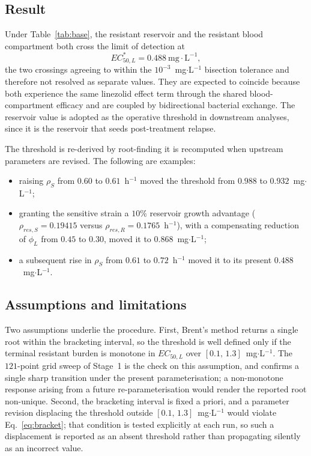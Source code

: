 \documentclass[11pt]{article}
\begin{document}
\subsection{Result}
\label{sec:threshold_result}

Under Table~\ref{tab:base}, the resistant reservoir and the resistant blood
compartment both cross the limit of detection at
\begin{equation}
EC_{50,L}^{*} = 0.488~\mathrm{mg}\cdot\mathrm{L}^{-1},
\end{equation}
the two crossings agreeing to within the $10^{-3}$~mg$\cdot$L$^{-1}$
bisection tolerance and therefore not resolved as separate values. They are
expected to coincide because both experience the same linezolid effect term
through the shared blood-compartment efficacy and are coupled by
bidirectional bacterial exchange. The reservoir value is adopted as the
operative threshold in downstream analyses, since it is the reservoir that
seeds post-treatment relapse.

The threshold is re-derived by root-finding it is recomputed when upstream parameters are revised.
The following are examples:

\begin{itemize}
\item raising $\rho_S$ from $0.60$ to $0.61$~h$^{-1}$ moved the threshold
from $0.988$ to $0.932$~mg$\cdot$L$^{-1}$;
\item granting the sensitive strain a $10\%$ reservoir growth advantage
($\rho_{res,S} = 0.19415$ versus $\rho_{res,R} = 0.1765$~h$^{-1}$), with a
compensating reduction of $\phi_L$ from $0.45$ to $0.30$, moved it to
$0.868$~mg$\cdot$L$^{-1}$;
\item a subsequent rise in $\rho_S$ from $0.61$ to $0.72$~h$^{-1}$ moved it
to its present $0.488$~mg$\cdot$L$^{-1}$.
\end{itemize}

\subsection{Assumptions and limitations}

Two assumptions underlie the procedure. First, Brent's method returns a
single root within the bracketing interval, so the threshold is well
defined only if the terminal resistant burden is monotone in $EC_{50,L}$
over $[0.1,\,1.3]$~mg$\cdot$L$^{-1}$. The $121$-point grid sweep of
Stage~1 is the check on this assumption, and confirms a single sharp
transition under the present parameterisation; a non-monotone response
arising from a future re-parameterisation would render the reported root
non-unique. Second, the bracketing interval is fixed a priori, and a
parameter revision displacing the threshold outside
$[0.1,\,1.3]$~mg$\cdot$L$^{-1}$ would violate Eq.~\eqref{eq:bracket}; that
condition is tested explicitly at each run, so such a displacement is
reported as an absent threshold rather than propagating silently as an
incorrect value.
\end{document}
